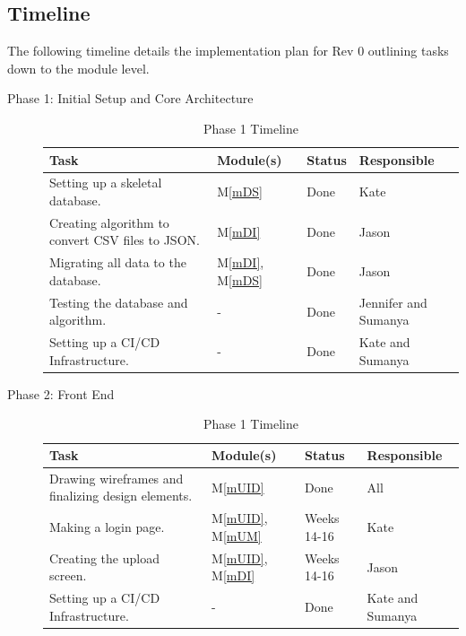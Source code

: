 \documentclass[12pt, titlepage]{article}
\newcommand{\mref}[1]{M\ref{#1}}
\begin{document}
\begin{description}
\begin{description}
\section{Timeline}
The following timeline details the implementation plan for Rev 0 outlining tasks down to 
the module level.
\begin{description}
  \item[Phase 1: Initial Setup and Core Architecture] 
  \begin{table}[H]
    \centering
    \begin{tabular}{p{} p{} p{} p{}}
    \toprule
    \textbf{Task} & \textbf{Module(s)} & \textbf{Status} & \textbf{Responsible}\\
    \midrule
    Setting up a skeletal database. & \mref{mDS} & Done & Kate\\
    Creating algorithm to convert CSV files to JSON. & \mref{mDI} & Done & Jason\\
    Migrating all data to the database. & \mref{mDI}, \mref{mDS} & Done & Jason\\
    Testing the database and algorithm. & - & Done & Jennifer and Sumanya\\
    \midrule
    Setting up a CI/CD Infrastructure. & - & Done & Kate and Sumanya\\
    \bottomrule
    \end{tabular}
    \caption{Phase 1 Timeline}
    \label{TblACT}
    \end{table}

  \item[Phase 2: Front End]
  \begin{table}[H]
    \centering
    \begin{tabular}{p{} p{} p{} p{}}
    \toprule
    \textbf{Task} & \textbf{Module(s)} & \textbf{Status} & \textbf{Responsible}\\
    \midrule
    Drawing wireframes and finalizing design elements. & \mref{mUID} & Done & All\\
    Making a login page. & \mref{mUID}, \mref{mUM} & Weeks 14-16  & Kate\\
    Creating the upload screen. & \mref{mUID}, \mref{mDI} & Weeks 14-16 & Jason\\
    \midrule
    
    Setting up a CI/CD Infrastructure. & - & Done & Kate and Sumanya\\
    \bottomrule
    \end{tabular}
    \caption{Phase 1 Timeline}
    \label{TblACT}
    \end{table}
    

\end{description}
\end{description}
\end{description}
\end{document}

